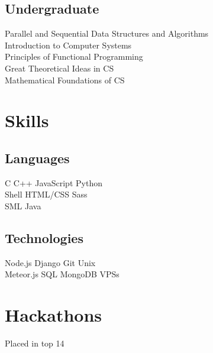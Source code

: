 \documentclass[]{deedy-resume-openfont}
\begin{document}
\begin{minipage}[t]{0.33\textwidth}
\subsection{Undergraduate}
Parallel and Sequential Data Structures and Algorithms\\
Introduction to Computer Systems\\
Principles of Functional Programming\\
Great Theoretical Ideas in CS\\
Mathematical Foundations of CS\\
\sectionsep


\section{Skills}
\subsection{Languages}
C \textbullet{} C++ \textbullet{} JavaScript \textbullet{} Python \\
Shell \textbullet{}  HTML/CSS \textbullet{} Sass \\
SML \textbullet{} Java \\
\sectionsep

\subsection{Technologies}
Node.js \textbullet{} Django \textbullet{} Git \textbullet{} Unix\\
Meteor.js \textbullet{} SQL \textbullet{} MongoDB \textbullet{} VPSs
\sectionsep


\section{Hackathons} 
\vspace{\topsep} %
\begin{tightemize}
\item Placed in top 14
\end{tightemize}


\end{minipage}
\end{document}
